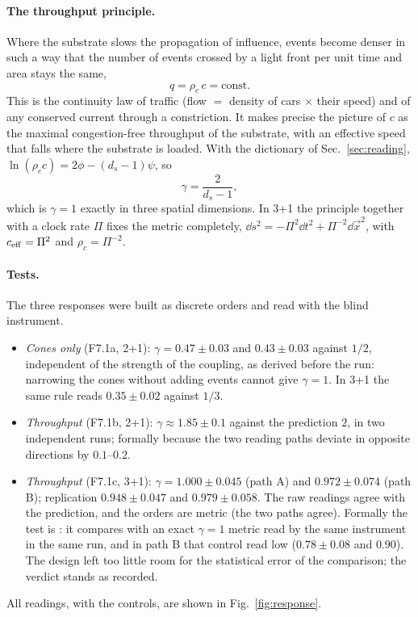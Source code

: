 \paragraph{The throughput principle.} Where the substrate slows the propagation of influence, events
become denser in such a way that the number of events crossed by a light front per unit time and
area stays the same,
\begin{equation}\label{eq:throughput}
  q=\rho_c\,c=\text{const}.
\end{equation}
This is the continuity law of traffic (flow $=$ density of cars $\times$ their speed) and of any conserved current through a
constriction. It makes precise the picture of $c$ as the maximal congestion-free throughput of the
substrate, with an effective speed that falls where the substrate is loaded.
With the dictionary of Sec.~\ref{sec:reading}, $\ln(\rho_c c)=2\phi-(d_s-1)\psi$, so
\begin{equation}
  \gamma=\frac{2}{d_s-1},
\end{equation}
which is $\gamma=1$ exactly in three spatial dimensions. In 3+1 the principle together with a clock
rate $\Pi$ fixes the metric completely, $\dd s^2=-\Pi^2\dd t^2+\Pi^{-2}\dd\vec x^2$, with
$c_{\rm eff}=\Pi^2$ and $\rho_c=\Pi^{-2}$.

\paragraph{Tests.} The three responses were built as discrete orders and read with the blind
instrument.
\begin{itemize}
\item \emph{Cones only} (F7.1a, 2+1): $\gamma=0.47\pm0.03$ and $0.43\pm0.03$ against $1/2$,
  independent of the strength of the coupling, as derived before the run: narrowing the cones without
  adding events cannot give $\gamma=1$. In 3+1 the same rule reads $0.35\pm0.02$ against $1/3$.
\item \emph{Throughput} (F7.1b, 2+1): $\gamma\approx1.85\pm0.1$ against the prediction $2$, in two
  independent runs; formally  because the two reading paths deviate in
  opposite directions by $0.1$--$0.2$.
\item \emph{Throughput} (F7.1c, 3+1): $\gamma=1.000\pm0.045$ (path A) and $0.972\pm0.074$ (path B);
  replication $0.948\pm0.047$ and $0.979\pm0.058$. The raw readings agree with the prediction, and
  the orders are metric (the two paths agree). Formally the test is : it compares
  with an exact $\gamma=1$ metric read by the same instrument in the same run, and in path B that
  control read low ($0.78\pm0.08$ and $0.90$). The design left too little room for the statistical
  error of the comparison; the verdict stands as recorded.
\end{itemize}
All readings, with the controls, are shown in Fig.~\ref{fig:response}.

